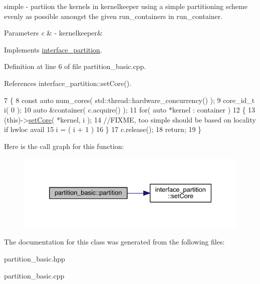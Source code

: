 simple -\/ partiion the kernels in kernelkeeper using a simple partitioning scheme evenly as possible amongst the given run\+\_\+containers in run\+\_\+container. 
\begin{DoxyParams}{Parameters}
{\em c} & -\/ kernelkeeper\& \\
\hline
\end{DoxyParams}


Implements \hyperlink{classinterface__partition_a7161f6277517624347fda38c8ffa019d}{interface\+\_\+partition}.



Definition at line 6 of file partition\+\_\+basic.\+cpp.



References interface\+\_\+partition\+::set\+Core().


\begin{DoxyCode}
7 \{
8     \textcolor{keyword}{const} \textcolor{keyword}{auto} num\_cores( std::thread::hardware\_concurrency() );
9     core\_id\_t i( 0 );
10     \textcolor{keyword}{auto} &container( c.acquire() );
11     \textcolor{keywordflow}{for}( \textcolor{keyword}{auto} *kernel : container )
12     \{
13        (\textcolor{keyword}{this})->\hyperlink{classinterface__partition_af7c257c87d13508274e934328ee90f52}{setCore}( *kernel, i );
14        \textcolor{comment}{//FIXME, too simple should be based on locality if hwloc avail}
15        i = ( i + 1 ) %
16     \}
17     c.release();
18     \textcolor{keywordflow}{return};
19 \}
\end{DoxyCode}
Here is the call graph for this function\+:
\nopagebreak
\begin{figure}[H]
\begin{center}
\leavevmode
\includegraphics[width=333pt]{classpartition__basic_a3dc4106326788887f9a7c6ac49bb46d4_cgraph}
\end{center}
\end{figure}


The documentation for this class was generated from the following files\+:\begin{DoxyCompactItemize}
\item 
partition\+\_\+basic.\+hpp\item 
partition\+\_\+basic.\+cpp\end{DoxyCompactItemize}
